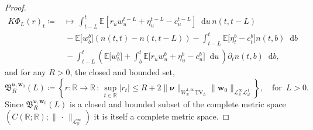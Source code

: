\documentclass[10pt,a4paper]{amsart}
\theoremstyle{plain}
\theoremstyle{plain}
\theoremstyle{definition}
\theoremstyle{remark}
\newcommand{\TV}{\text{TV}}
\newcommand{\bnu}{\boldsymbol{\nu}}
\newcommand{\bw}{\mathbf{w}}
\newcommand{\dd}{\mathop{}\!\mathrm{d}}
\newcommand{\fB}{\mathfrak{B}}
\newcommand{\mbE}{\mathbb{E}}
\newcommand{\mbR}{\mathbb{R}}
\newcommand{\msL}{\mathscr{L}}
\begin{document}
\begin{proof}
\begin{equation}
       \begin{aligned}
           K \Phi_L(r)_t \coloneqq  &\mapsto \,\int_{t-L}^{t} \mbE\left[r_u w^{t-L}_u  + \eta^{t-L}_u - c^{t-L}_u  \right] \dd u \,n(t,t-L)  \\
      &\,-\mbE\big[w^b_b\big]\left(n(t,t) -n(t,t-L)\right) -\int_{t-L}^{t} \mbE\big[\eta^b_{t} - c^b_{t}  \big]  n(t,b) \dd b\\
      &\,-  \int_{t-L}^{t}\left(\mbE\big[w^b_b\big] +\int_b^{t} \mbE\big[r_u w^b_u + \eta^b_u - c^b_u \big] \dd u \,\right)   \partial_t n(t,b) \dd b,
       \end{aligned}
   \end{equation}
and for any $R>0$, the closed and bounded set, %
%
\begin{equation}\label{eq:olg_rate_closed_set}
    \fB^{\bnu,\bw_0}_R(L) \coloneqq \left\{ r:\mbR\to \mbR \,:\, \sup_{t\in \mbR}|r_t| \leq R+2\|\bnu\|_{W^{1,\infty}_{\mbR}\TV_L} \|\bw_0\|_{\msL^\infty_\mbR \msL^1_\omega} \right\},\quad \text{for }\, L>0.
\end{equation}
Since $ \fB^{\bnu,\bw_0}_R(L)$ is a closed and bounded subset of the complete metric space $(C(\mbR;\mbR);\|\,\cdot\,\|_{\msL^\infty_{\mbR}})$ it is itself a complete metric space.
   

\end{proof}
\end{document}
